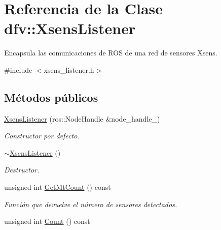 \hypertarget{classdfv_1_1XsensListener}{\section{\-Referencia de la \-Clase dfv\-:\-:\-Xsens\-Listener}
\label{classdfv_1_1XsensListener}
}


\-Encapsula las comunicaciones de \-R\-O\-S de una red de sensores \-Xsens.  




{\ttfamily \#include $<$xsens\-\_\-listener.\-h$>$}

\subsection*{\-Métodos públicos}
\begin{DoxyCompactItemize}
\item 
\hyperlink{classdfv_1_1XsensListener_a545d4b10d2c34166d82bc41403e39a00}{\-Xsens\-Listener} (ros\-::\-Node\-Handle \&node\-\_\-handle\-\_\-)
\begin{DoxyCompactList}\small\item\em \-Constructor por defecto. \end{DoxyCompactList}\item 
\hypertarget{classdfv_1_1XsensListener_abe379af82320a08aa76f0741a7f11db0}{\hyperlink{classdfv_1_1XsensListener_abe379af82320a08aa76f0741a7f11db0}{$\sim$\-Xsens\-Listener} ()}\label{classdfv_1_1XsensListener_abe379af82320a08aa76f0741a7f11db0}

\begin{DoxyCompactList}\small\item\em \-Destructor. \end{DoxyCompactList}\item 
\hypertarget{classdfv_1_1XsensListener_a5d31c2bd34dcbd18c60634e994c02ed3}{unsigned int \hyperlink{classdfv_1_1XsensListener_a5d31c2bd34dcbd18c60634e994c02ed3}{\-Get\-Mt\-Count} () const }\label{classdfv_1_1XsensListener_a5d31c2bd34dcbd18c60634e994c02ed3}

\begin{DoxyCompactList}\small\item\em \-Función que devuelve el número de sensores detectados. \end{DoxyCompactList}\item 
\hypertarget{classdfv_1_1XsensListener_ac7c7c4298be9812ce8bc4948a71ffe2b}{unsigned int \hyperlink{classdfv_1_1XsensListener_ac7c7c4298be9812ce8bc4948a71ffe2b}{\-Count} () const }\label{classdfv_1_1XsensListener_ac7c7c4298be9812ce8bc4948a71ffe2b}


\end{DoxyCompactItemize}
